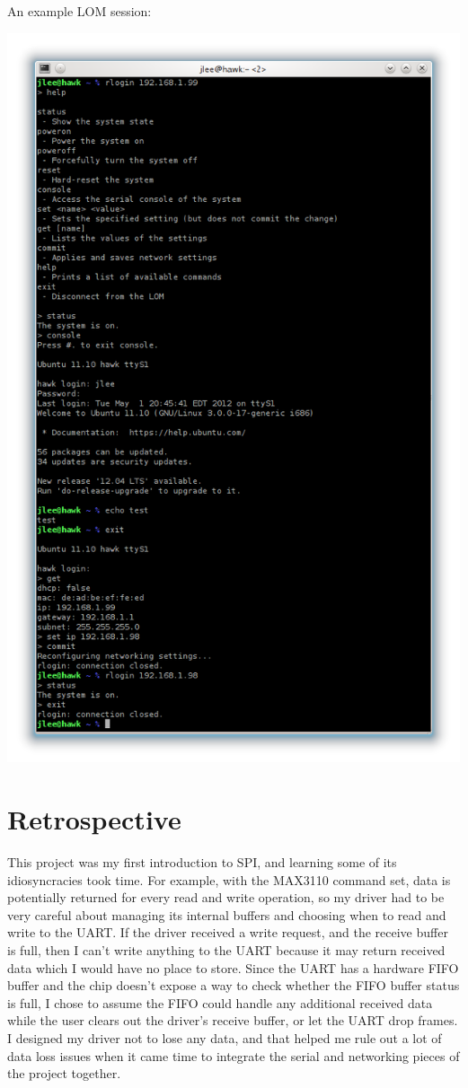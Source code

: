 \documentclass{amsart}
\begin{document}
An example LOM session:
\begin{center}
\includegraphics[height=.9\textheight]{session.png}
\end{center}

\section{Retrospective}
This project was my first introduction to SPI, and learning some of its idiosyncracies took time.  For example, with the MAX3110 command set, data is potentially returned for every read and write operation, so my driver had to be very careful about managing its internal buffers and choosing when to read and write to the UART.  If the driver received a write request, and the receive buffer is full, then I can't write anything to the UART because it may return received data which I would have no place to store.  Since the UART has a hardware FIFO buffer and the chip doesn't expose a way to check whether the FIFO buffer status is full, I chose to assume the FIFO could handle any additional received data while the user clears out the driver's receive buffer, or let the UART drop frames.  I designed my driver not to lose any data, and that helped me rule out a lot of data loss issues when it came time to integrate the serial and networking pieces of the project together.
\end{document}
